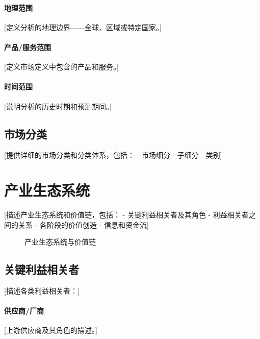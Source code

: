 \documentclass[11pt,letterpaper]{report}
\begin{document}
{\paragraph{地理范围}
[定义分析的地理边界——全球、区域或特定国家。]

\paragraph{产品/服务范围}
[定义市场定义中包含的产品和服务。]

\paragraph{时间范围}
[说明分析的历史时期和预测期间。]

\subsection{市场分类}

[提供详细的市场分类和分类体系，包括：
- 市场细分
- 子细分
- 类别]

\section{产业生态系统}


[描述产业生态系统和价值链，包括：
- 关键利益相关者及其角色
- 利益相关者之间的关系
- 各阶段的价值创造
- 信息和资金流]

\begin{figure}[htbp]
\centering
\caption{产业生态系统与价值链}
\label{fig:ecosystem}
\end{figure}

\subsection{关键利益相关者}

[描述各类利益相关者：]

\paragraph{供应商/厂商}
[上游供应商及其角色的描述。]

}
\end{document}
